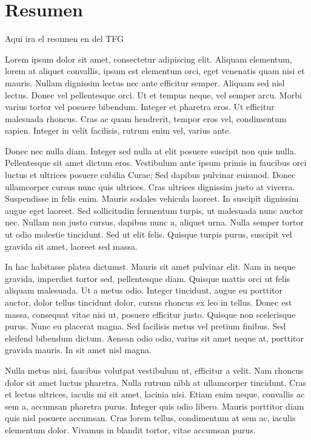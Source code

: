 
\chapter*{Resumen}

Aqui ira el resumen en del TFG





Lorem ipsum dolor sit amet, consectetur adipiscing elit. Aliquam elementum, lorem at aliquet convallis, ipsum est elementum orci, eget venenatis quam nisi et mauris. Nullam dignissim lectus nec ante efficitur semper. Aliquam sed nisl lectus. Donec vel pellentesque orci. Ut et tempus neque, vel semper arcu. Morbi varius tortor vel posuere bibendum. Integer et pharetra eros. Ut efficitur malesuada rhoncus. Cras ac quam hendrerit, tempor eros vel, condimentum sapien. Integer in velit facilisis, rutrum enim vel, varius ante.

Donec nec nulla diam. Integer sed nulla at elit posuere suscipit non quis nulla. Pellentesque sit amet dictum eros. Vestibulum ante ipsum primis in faucibus orci luctus et ultrices posuere cubilia Curae; Sed dapibus pulvinar euismod. Donec ullamcorper cursus nunc quis ultrices. Cras ultrices dignissim justo at viverra. Suspendisse in felis enim. Mauris sodales vehicula laoreet. In suscipit dignissim augue eget laoreet. Sed sollicitudin fermentum turpis, ut malesuada nunc auctor nec. Nullam non justo cursus, dapibus nunc a, aliquet urna. Nulla semper tortor ut odio molestie tincidunt. Sed ut elit felis. Quisque turpis purus, suscipit vel gravida sit amet, laoreet sed massa.

In hac habitasse platea dictumst. Mauris sit amet pulvinar elit. Nam in neque gravida, imperdiet tortor sed, pellentesque diam. Quisque mattis orci ut felis aliquam malesuada. Ut a metus odio. Integer tincidunt, augue eu porttitor auctor, dolor tellus tincidunt dolor, cursus rhoncus ex leo in tellus. Donec est massa, consequat vitae nisi ut, posuere efficitur justo. Quisque non scelerisque purus. Nunc eu placerat magna. Sed facilisis metus vel pretium finibus. Sed eleifend bibendum dictum. Aenean odio odio, varius sit amet neque at, porttitor gravida mauris. In sit amet nisl magna.

Nulla metus nisi, faucibus volutpat vestibulum ut, efficitur a velit. Nam rhoncus dolor sit amet luctus pharetra. Nulla rutrum nibh at ullamcorper tincidunt. Cras et lectus ultrices, iaculis mi sit amet, lacinia nisi. Etiam enim neque, convallis ac sem a, accumsan pharetra purus. Integer quis odio libero. Mauris porttitor diam quis nisl posuere accumsan. Cras lorem tellus, condimentum at sem ac, iaculis elementum dolor. Vivamus in blandit tortor, vitae accumsan purus.

